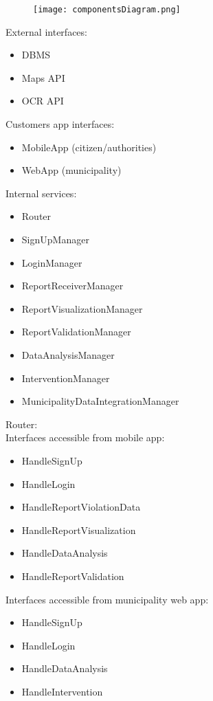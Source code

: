\begin{figure}[H]
	\texttt{[image: componentsDiagram.png]}
\end{figure}

External interfaces:
\begin{itemize}
	\item DBMS
	\item Maps API
	\item OCR API
\end{itemize}

Customers app interfaces:
\begin{itemize}
	\item MobileApp (citizen/authorities)
	\item WebApp (municipality)
\end{itemize}

Internal services:
\begin{itemize}
	\item Router
	\item SignUpManager
	\item LoginManager
	\item ReportReceiverManager
	\item ReportVisualizationManager
	\item ReportValidationManager
	\item DataAnalysisManager
	\item InterventionManager
	\item MunicipalityDataIntegrationManager
\end{itemize}

\bigskip
Router:\\
Interfaces accessible from mobile app:
\begin{itemize}
	\item HandleSignUp
	\item HandleLogin
	\item HandleReportViolationData
	\item HandleReportVisualization
	\item HandleDataAnalysis
	\item HandleReportValidation
\end{itemize}
Interfaces accessible from municipality web app:
\begin{itemize}
	\item HandleSignUp
	\item HandleLogin
	\item HandleDataAnalysis
	\item HandleIntervention 
\end{itemize}

